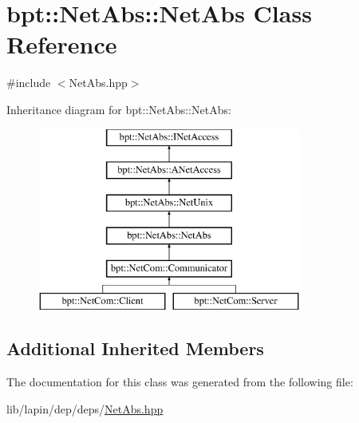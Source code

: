 \hypertarget{classbpt_1_1_net_abs_1_1_net_abs}{\section{bpt\-:\-:Net\-Abs\-:\-:Net\-Abs Class Reference}
\label{classbpt_1_1_net_abs_1_1_net_abs}
}


{\ttfamily \#include $<$Net\-Abs.\-hpp$>$}

Inheritance diagram for bpt\-:\-:Net\-Abs\-:\-:Net\-Abs\-:\begin{figure}[H]
\begin{center}
\leavevmode
\includegraphics[height=6.000000cm]{classbpt_1_1_net_abs_1_1_net_abs}
\end{center}
\end{figure}
\subsection*{Additional Inherited Members}


The documentation for this class was generated from the following file\-:\begin{DoxyCompactItemize}
\item 
lib/lapin/dep/deps/\hyperlink{_net_abs_8hpp}{Net\-Abs.\-hpp}\end{DoxyCompactItemize}
